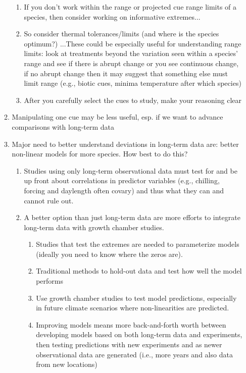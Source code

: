 \documentclass[11pt,letterpaper]{article}
\begin{document}
\begin{enumerate}
\begin{enumerate}
\begin{enumerate}
\item If you don't work within the range or projected cue range limits of a species, then consider working on informative extremes...
\item So consider thermal tolerances/limits (and where is the species optimum?) ...These could be especially useful for understanding range limits: look at treatments beyond the variation seen within a species' range and see if there is abrupt change or you see continuous change, if no abrupt change then it may suggest that something else must limit range (e.g., biotic cues, minima temperature after which species)
\item After you carefully select the cues to study, make your reasoning clear 
\end{enumerate}
\item Manipulating one cue may be less useful, esp. if we want to advance comparisons with long-term data
\item Major need to better understand deviations in long-term data are: better non-linear models for more species. How best to do this?
\begin{enumerate}
\item Studies using only long-term observational data must test for and be up front about correlations in predictor variables (e.g., chilling, forcing and daylength often covary) and thus what they can and cannot rule out. 
\item A better option than just long-term data are more efforts to integrate long-term data with growth chamber studies.
\begin{enumerate}
\item Studies that test the extremes are needed to parameterize models (ideally you need to know where the zeros are).
\item Traditional methods to hold-out data and test how well the model performs
\item Use growth chamber studies to test model predictions, especially in future climate scenarios where non-linearities are predicted. 
\item Improving models means more back-and-forth worth between developing models based on both long-term data and experiments, then testing predictions with new experiments and as newer observational data are generated (i.e., more years and also data from new locations)
\end{enumerate}
\end{enumerate}

\end{enumerate}
\end{enumerate}
\end{document}
